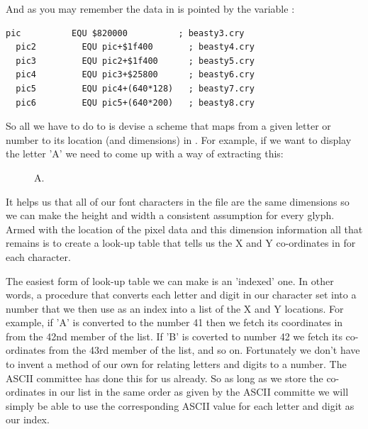 And as you may remember the data in  is pointed by the variable :

\begin{lstlisting}[escapechar=\%]
  pic          EQU $820000          ; beasty3.cry
  pic2         EQU pic+$1f400       ; beasty4.cry
  pic3         EQU pic2+$1f400      ; beasty5.cry
  pic4         EQU pic3+$25800      ; beasty6.cry
  pic5         EQU pic4+(640*128)   ; beasty7.cry
  pic6         EQU pic5+(640*200)   ; beasty8.cry
\end{lstlisting}

So all we have to do to is devise a scheme that maps from a given letter 
or number to its location (and dimensions) in .
For example, if we want to display the letter 'A' we need to come up with a way of extracting this:
\begin{figure}[H]
    \centering
    \begin{adjustbox}{width=1cm,center}
    \end{adjustbox}
\caption*{A.}
\end{figure}

It helps us that all of our font characters in the  file are the same dimensions so we can make the height and
width a consistent assumption for every glyph. Armed with the location of the pixel data and this dimension information
all that remains is to create a look-up table that tells us the X and Y co-ordinates in  for each
character.

The easiest form of look-up table we can make is an 'indexed' one. In other words, a procedure that converts each letter and digit in our character set
into a number that we then use as an index into a list of the X and Y locations. For example, if 'A' is converted to the number 41 then we fetch its
coordinates in  from the 42nd member of the list. If 'B' is coverted to number 42 we fetch its co-ordinates from the 43rd member
of the list, and so on. Fortunately we don't have to invent a method of our own for relating letters and digits to a number. The ASCII committee has
done this for us already. So as long as we store the co-ordinates in our list in the same order as given by the ASCII committe we will simply be able
to use the corresponding ASCII value for each letter and digit as our index.


